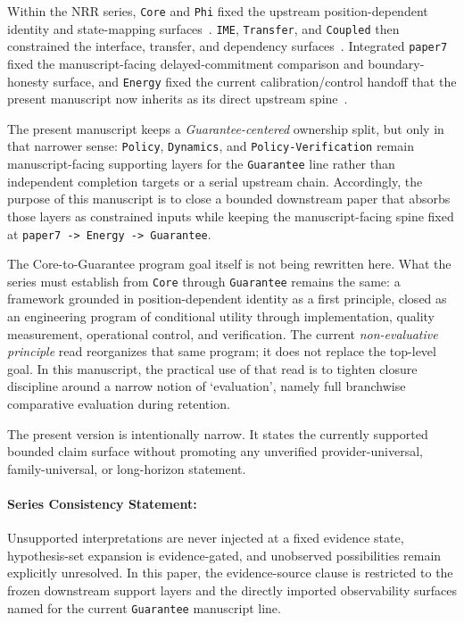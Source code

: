 \documentclass[11pt]{article}
\begin{document}
Within the NRR series, \texttt{Core} and \texttt{Phi} fixed the upstream
position-dependent identity and state-mapping surfaces~\cite{saito2025nrr,saito2026phi}.
\texttt{IME}, \texttt{Transfer}, and \texttt{Coupled} then constrained the
interface, transfer, and dependency surfaces~\cite{saito2026ime,saito2026transfer,saito2026coupled}.
Integrated \texttt{paper7} fixed the manuscript-facing delayed-commitment
comparison and boundary-honesty surface, and \texttt{Energy} fixed the current
calibration/control handoff that the present manuscript now inherits as its
direct upstream spine~\cite{saito2026principles,saito2026energy}.

The present manuscript keeps a \textit{Guarantee-centered} ownership split, but
only in that narrower sense: \texttt{Policy}, \texttt{Dynamics}, and
\texttt{Policy-Verification} remain manuscript-facing supporting layers for the
\texttt{Guarantee} line rather than independent completion targets or a serial
upstream chain. Accordingly, the purpose of this manuscript is to close a
bounded downstream paper that absorbs those layers as constrained inputs while
keeping the manuscript-facing spine fixed at \texttt{paper7 -> Energy -> Guarantee}.

The Core-to-Guarantee program goal itself is not being rewritten here. What the
series must establish from \texttt{Core} through \texttt{Guarantee} remains the
same: a framework grounded in position-dependent identity as a first principle,
closed as an engineering program of conditional utility through
implementation, quality measurement, operational control, and verification. The
current \textit{non-evaluative principle} read reorganizes that same program; it
does not replace the top-level goal. In this manuscript, the practical use of
that read is to tighten closure discipline around a narrow notion of
`evaluation', namely full branchwise comparative evaluation during retention.

The present version is intentionally narrow. It states the currently supported
bounded claim surface without promoting any unverified provider-universal,
family-universal, or long-horizon statement.

\paragraph{Series Consistency Statement:}
Unsupported interpretations are never injected at a fixed evidence state,
hypothesis-set expansion is evidence-gated, and unobserved possibilities remain
explicitly unresolved. In this paper, the evidence-source clause is restricted to
the frozen downstream support layers and the directly imported observability
surfaces named for the current \texttt{Guarantee} manuscript line.
\end{document}
